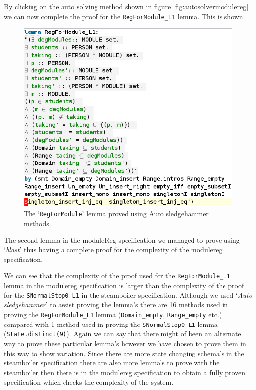 By clicking on the auto solving method shown in figure \ref{fig:autosolvermodulereg} we can now complete the proof for the \verb|RegForModule_L1| lemma. This is shown 

\begin{figure}[H]
\centering
\includegraphics[scale=0.5]{Figures/Evaluation/provenmodulelemma.png}
\caption{The `\texttt{RegForModule}' lemma proved using Auto sledgehammer methods. \label{fig:solvedmodulelemma}}
\end{figure}

The second lemma in the moduleReg specification we managed to prove using `\emph{blast}' thus having a complete proof for the complexity of the modulereg specification.

We can see that the complexity of the proof used for the \verb|RegForModule_L1| lemma in the modulereg specification is larger than the complexity of the proof for the \verb|SNormalStop0_L1| in the steamboiler specification. Although we used `\emph{Auto sledgehammer}' to assist proving the lemma's there are 16 methods used in proving the \verb|RegForModule_L1| lemma (\verb|Domain_empty|, \verb|Range_empty| etc.) compared with 1 method used in proving the \verb|SNormalStop0_L1| lemma (\verb|State.distinct(9)|). Again we can say that there might of been an alternate way to prove these particular lemma's however we have chosen to prove them in this way to show variation. Since there are more state changing schema's in the steamboiler specification there are also more lemma's to prove with the steamboiler then there is in the modulereg specification to obtain a fully proven specification which checks the complexity of the system.


